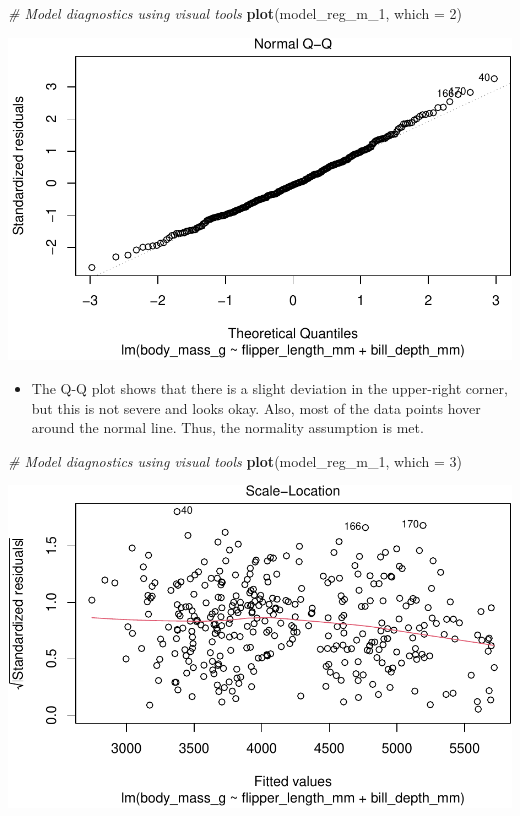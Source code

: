 \documentclass[
]{book}
\newenvironment{Shaded}{\begin{snugshade}}{\end{snugshade}}
\newcommand{\AttributeTok}[1]{\textcolor[rgb]{0.13,0.29,0.53}{#1}}
\newcommand{\CommentTok}[1]{\textcolor[rgb]{0.56,0.35,0.01}{\textit{#1}}}
\newcommand{\DecValTok}[1]{\textcolor[rgb]{0.00,0.00,0.81}{#1}}
\newcommand{\FunctionTok}[1]{\textcolor[rgb]{0.13,0.29,0.53}{\textbf{#1}}}
\newcommand{\NormalTok}[1]{#1}
\providecommand{\tightlist}{%
  \setlength{\itemsep}{0pt}\setlength{\parskip}{0pt}}
\begin{document}
\begin{Shaded}
\begin{Highlighting}[]
\CommentTok{\# Model diagnostics using visual tools}
\FunctionTok{plot}\NormalTok{(model\_reg\_m\_1, }\AttributeTok{which =} \DecValTok{2}\NormalTok{)}
\end{Highlighting}
\end{Shaded}

\includegraphics{PSY202A-Modeling-I.Heo_files/figure-latex/unnamed-chunk-119-1.pdf}

\begin{itemize}
\tightlist
\item
  The Q-Q plot shows that there is a slight deviation in the upper-right corner, but this is not severe and looks okay. Also, most of the data points hover around the normal line. Thus, the normality assumption is met.
\end{itemize}

\begin{Shaded}
\begin{Highlighting}[]
\CommentTok{\# Model diagnostics using visual tools}
\FunctionTok{plot}\NormalTok{(model\_reg\_m\_1, }\AttributeTok{which =} \DecValTok{3}\NormalTok{)}
\end{Highlighting}
\end{Shaded}

\includegraphics{PSY202A-Modeling-I.Heo_files/figure-latex/unnamed-chunk-120-1.pdf}
\end{document}
